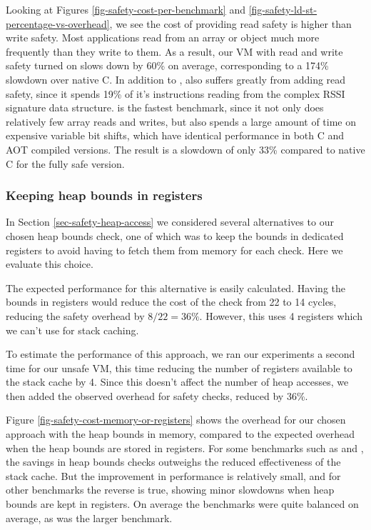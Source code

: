 Looking at Figures \ref{fig-safety-cost-per-benchmark} and \ref{fig-safety-ld-st-percentage-vs-overhead}, we see the cost of providing read safety is higher than write safety. Most applications read from an array or object much more frequently than they write to them. As a result, our VM with read and write safety turned on slows down by 60\% on average, corresponding to a 174\% slowdown over native C. In addition to ,  also suffers greatly from adding read safety, since it spends 19\% of it's instructions reading from the complex RSSI signature data structure.  is the fastest benchmark, since it not only does relatively few array reads and writes, but also spends a large amount of time on expensive variable bit shifts, which have identical performance in both C and AOT compiled versions. The result is a slowdown of only 33\% compared to native C for the fully safe version.

\subsubsection{Keeping heap bounds in registers}
In Section \ref{sec-safety-heap-access} we considered several alternatives to our chosen heap bounds check, one of which was to keep the bounds in dedicated registers to avoid having to fetch them from memory for each check. Here we evaluate this choice.

The expected performance for this alternative is easily calculated. Having the bounds in registers would reduce the cost of the check from 22 to 14 cycles, reducing the safety overhead by $8/22=36\%$. However, this uses 4 registers which we can't use for stack caching.

To estimate the performance of this approach, we ran our experiments a second time for our unsafe VM, this time reducing the number of registers available to the stack cache by 4. Since this doesn't affect the number of heap accesses, we then added the observed overhead for safety checks, reduced by 36\%.

Figure \ref{fig-safety-cost-memory-or-registers} shows the overhead for our chosen approach with the heap bounds in memory, compared to the expected overhead when the heap bounds are stored in registers. For some benchmarks such as  and , the savings in heap bounds checks outweighs the reduced effectiveness of the stack cache. But the improvement in performance is relatively small, and for other benchmarks the reverse is true, showing minor slowdowns when heap bounds are kept in registers. On average the benchmarks were quite balanced on average, as was the larger  benchmark.

